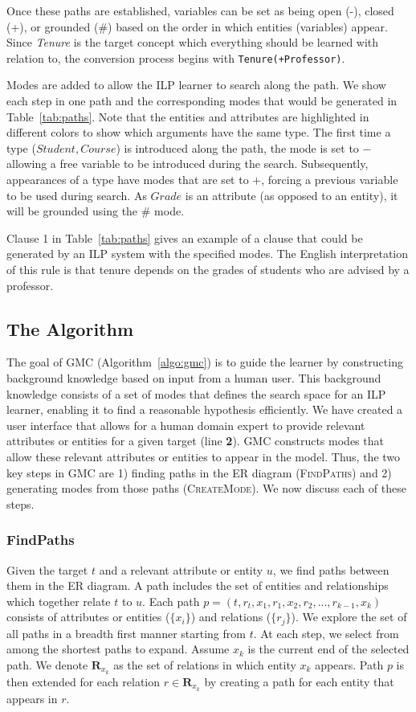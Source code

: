 \documentclass[sigconf]{acmart}
\begin{document}
Once these paths are established, variables can be set as being open (-), closed (+), or grounded (\#) based on the order in which entities (variables) appear. Since \textit{Tenure} is the target concept which everything should be learned with relation to, the conversion process begins with \texttt{Tenure(+Professor)}.

Modes are added to allow the ILP learner to search along the path. We show each step in one path and the corresponding modes that would be generated in Table~\ref{tab:paths}. Note that the entities and attributes are highlighted in different colors to show which arguments have the same type. The first time a type ($Student, Course$) is introduced along the path, the mode is set to $-$ allowing a free variable to be introduced during the search. Subsequently, appearances of a type have modes that are set to $+$, forcing a previous variable to be used during search. As $Grade$ is an attribute (as opposed to an entity), it will be grounded using the $\#$ mode.

Clause 1 in Table~\ref{tab:paths} gives an example of a clause that could be generated by an ILP system with the specified modes. The English interpretation of this rule is that tenure depends on the grades of students who are advised by a professor.

\subsection{The Algorithm}

The goal of \textsc{GMC} (Algorithm~\ref{algo:gmc}) is to guide the learner by constructing background knowledge based on input from a human user. This background knowledge consists of a set of modes that defines the search space for an ILP learner, enabling it to find a reasonable hypothesis efficiently. We have created a user interface that allows for a human domain expert to provide relevant attributes or entities for a given target (line \textbf{2}). \textsc{GMC} constructs modes that allow these relevant attributes or entities to appear in the model. Thus, the two key steps in \textsc{GMC} are 1) finding paths in the ER diagram (\textsc{FindPaths}) and 2) generating modes from those paths (\textsc{CreateMode}). We now discuss each of these steps.

\subsubsection{FindPaths}
Given the target $t$ and a relevant attribute or entity $u$, we find paths between them in the ER diagram. A path includes the set of entities and relationships which together relate $t$ to $u$. Each path $p=(t,r_t,x_1,r_1,x_2,r_2,...,r_{k-1},x_k)$ consists of attributes or entities ($\{x_i\}$) and relations ($\{r_j\}$). We explore the set of all paths in a breadth first manner starting from $t$. At each step, we select from among the shortest paths to expand. Assume $x_k$ is the current end of the selected path. We denote $\mathbf{R}_{x_k}$ as the set of relations in which entity $x_k$ appears. Path $p$ is then extended for each relation $r\in \mathbf{R}_{x_k}$ by creating a path for each entity that appears in $r$. 
\end{document}
